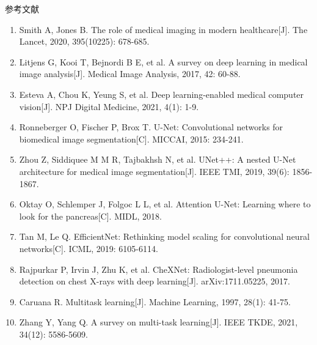 \documentclass{harryopo-slides}
\begin{document}
\begin{frame}{参考文献}
\small
\begin{enumerate}
  \item Smith A, Jones B. The role of medical imaging in modern healthcare[J]. The Lancet, 2020, 395(10225): 678-685.
  \item Litjens G, Kooi T, Bejnordi B E, et al. A survey on deep learning in medical image analysis[J]. Medical Image Analysis, 2017, 42: 60-88.
  \item Esteva A, Chou K, Yeung S, et al. Deep learning-enabled medical computer vision[J]. NPJ Digital Medicine, 2021, 4(1): 1-9.
  \item Ronneberger O, Fischer P, Brox T. U-Net: Convolutional networks for biomedical image segmentation[C]. MICCAI, 2015: 234-241.
  \item Zhou Z, Siddiquee M M R, Tajbakhsh N, et al. UNet++: A nested U-Net architecture for medical image segmentation[J]. IEEE TMI, 2019, 39(6): 1856-1867.
  \item Oktay O, Schlemper J, Folgoc L L, et al. Attention U-Net: Learning where to look for the pancreas[C]. MIDL, 2018.
  \item Tan M, Le Q. EfficientNet: Rethinking model scaling for convolutional neural networks[C]. ICML, 2019: 6105-6114.
  \item Rajpurkar P, Irvin J, Zhu K, et al. CheXNet: Radiologist-level pneumonia detection on chest X-rays with deep learning[J]. arXiv:1711.05225, 2017.
  \item Caruana R. Multitask learning[J]. Machine Learning, 1997, 28(1): 41-75.
  \item Zhang Y, Yang Q. A survey on multi-task learning[J]. IEEE TKDE, 2021, 34(12): 5586-5609.
\end{enumerate}
\end{frame}
\end{document}
